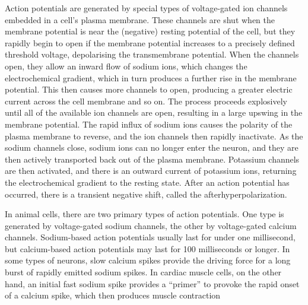 \documentclass[]{book}
\begin{document}
Action potentials are generated by special types of voltage-gated ion channels embedded in a cell's plasma membrane. These channels are shut when the membrane potential is near the (negative) resting potential of the cell, but they rapidly begin to open if the membrane potential increases to a precisely defined threshold voltage, depolarising the transmembrane potential. When the channels open, they allow an inward flow of sodium ions, which changes the electrochemical gradient, which in turn produces a further rise in the membrane potential. This then causes more channels to open, producing a greater electric current across the cell membrane and so on. The process proceeds explosively until all of the available ion channels are open, resulting in a large upswing in the membrane potential. The rapid influx of sodium ions causes the polarity of the plasma membrane to reverse, and the ion channels then rapidly inactivate. As the sodium channels close, sodium ions can no longer enter the neuron, and they are then actively transported back out of the plasma membrane. Potassium channels are then activated, and there is an outward current of potassium ions, returning the electrochemical gradient to the resting state. After an action potential has occurred, there is a transient negative shift, called the afterhyperpolarization.

In animal cells, there are two primary types of action potentials. One type is generated by voltage-gated sodium channels, the other by voltage-gated calcium channels. Sodium-based action potentials usually last for under one millisecond, but calcium-based action potentials may last for 100 milliseconds or longer. In some types of neurons, slow calcium spikes provide the driving force for a long burst of rapidly emitted sodium spikes. In cardiac muscle cells, on the other hand, an initial fast sodium spike provides a ``primer'' to provoke the rapid onset of a calcium spike, which then produces muscle contraction
\end{document}
